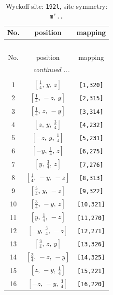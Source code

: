\documentclass[fleqn,8pt]{jsarticle}
\begin{document}
\begin{longtable}{ccc}
\caption{Wyckoff site: {\tt 192l}, site symmetry: {\tt m'..}}
 \\
 \hline \hline
No. & position & mapping \\ \hline \endfirsthead

\multicolumn{2}{l}{\tablename\ \thetable{}} \\
 \hline \hline
No. & position & mapping \\ \hline \endhead

 \hline \hline
\multicolumn{2}{r}{\footnotesize\it continued ...} \\ \endfoot

 \hline \hline
\multicolumn{2}{r}{} \\ \endlastfoot

1 & $\left[ \frac{1}{4},\, y,\, z \right]$ & {\tt [1,320]} \\ \hline
2 & $\left[ \frac{1}{4},\, - z,\, y \right]$ & {\tt [2,315]} \\ \hline
3 & $\left[ \frac{1}{4},\, z,\, - y \right]$ & {\tt [3,314]} \\ \hline
4 & $\left[ z,\, y,\, \frac{3}{4} \right]$ & {\tt [4,232]} \\ \hline
5 & $\left[ - z,\, y,\, \frac{1}{4} \right]$ & {\tt [5,231]} \\ \hline
6 & $\left[ - y,\, \frac{1}{4},\, z \right]$ & {\tt [6,275]} \\ \hline
7 & $\left[ y,\, \frac{3}{4},\, z \right]$ & {\tt [7,276]} \\ \hline
8 & $\left[ \frac{1}{4},\, - y,\, - z \right]$ & {\tt [8,313]} \\ \hline
9 & $\left[ \frac{3}{4},\, y,\, - z \right]$ & {\tt [9,322]} \\ \hline
10 & $\left[ \frac{3}{4},\, - y,\, z \right]$ & {\tt [10,321]} \\ \hline
11 & $\left[ y,\, \frac{1}{4},\, - z \right]$ & {\tt [11,270]} \\ \hline
12 & $\left[ - y,\, \frac{3}{4},\, - z \right]$ & {\tt [12,271]} \\ \hline
13 & $\left[ \frac{3}{4},\, z,\, y \right]$ & {\tt [13,326]} \\ \hline
14 & $\left[ \frac{3}{4},\, - z,\, - y \right]$ & {\tt [14,325]} \\ \hline
15 & $\left[ z,\, - y,\, \frac{1}{4} \right]$ & {\tt [15,221]} \\ \hline
16 & $\left[ - z,\, - y,\, \frac{3}{4} \right]$ & {\tt [16,220]} \\ \hline

\end{longtable}
\end{document}
